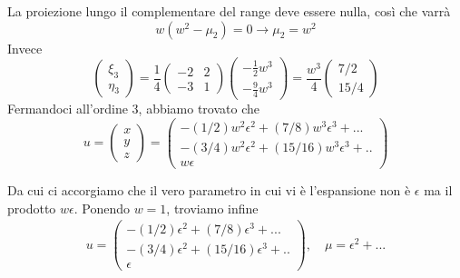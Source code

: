 \documentclass{report}
\begin{document}
\begin{example}
    La proiezione lungo il complementare del range deve essere nulla, così che varrà 
    \begin{equation}
        w(w^2 - \mu_2) = 0 \rightarrow \mu_2 = w^2
    \end{equation}
    Invece 
    \begin{equation}
        \begin{pmatrix}
            \xi_3 \\ \eta_3 
        \end{pmatrix} = \frac{1}{4}\begin{pmatrix}
            -2 & 2 \\ -3 & 1
        \end{pmatrix}\begin{pmatrix}
            -\frac{1}{2}w^3 \\ -\frac{9}{4}w^3 
        \end{pmatrix}
        = \frac{w^3}{4}\begin{pmatrix}
            7/2 \\ 15/4
        \end{pmatrix}
    \end{equation}
    Fermandoci all'ordine 3, abbiamo trovato che 
    \begin{equation}
        u = \begin{pmatrix}
            x \\ y \\ z 
        \end{pmatrix}
        = \begin{pmatrix}
            -(1/2)w^2\epsilon^2 + (7/8)w^3\epsilon^3+ ...\\ -(3/4)w^2\epsilon^2 + (15/16)w^3\epsilon^3 + .. \\ w\epsilon 
        \end{pmatrix}
    \end{equation}

    Da cui ci accorgiamo che il vero parametro in cui vi è l'espansione non è $\epsilon$ ma il prodotto $w\epsilon$. Ponendo $w =1$, troviamo infine 
    \begin{align}
        u 
        = \begin{pmatrix}
            -(1/2)\epsilon^2 + (7/8)\epsilon^3+ ...\\ -(3/4)\epsilon^2 + (15/16)\epsilon^3 + .. \\ \epsilon 
        \end{pmatrix}, \quad \mu = \epsilon^2 + ...
    \end{align}
\end{example}
\end{document}
